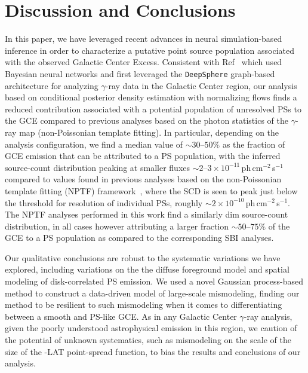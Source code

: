 \documentclass[prd,aps,10pt,nofootinbib,twocolumn,superscriptaddress,preprintnumbers,balancelastpage,longbibliography]{revtex4-1}
\begin{document}

\section{Discussion and Conclusions}
\label{sec:conclusion}

In this paper, we have leveraged recent advances in neural simulation-based inference in order to characterize a putative point source population associated with the observed \Fermi Galactic Center Excess. Consistent with Ref~\cite{List:2020mzd} which used Bayesian neural networks and first leveraged the \texttt{DeepSphere} graph-based architecture for analyzing $\gamma$-ray data in the Galactic Center region, our analysis based on conditional posterior density estimation with normalizing flows finds a reduced contribution associated with a potential population of unresolved PSs to the GCE compared to previous analyses based on the photon statistics of the $\gamma$-ray map (non-Poissonian template fitting). In particular, depending on the analysis configuration, we find a median value of $\sim30$--$50\%$ as the fraction of GCE emission that can be attributed to a PS population, with the inferred source-count distribution peaking at smaller fluxes $\sim2$--$3\times 10^{-11}$\,ph\,cm$^{-2}$\,s$^{-1}$ compared to values found in previous analyses based on the non-Poissonian template fitting (NPTF) framework~\cite{Lee:2015fea}, where the SCD is seen to peak just below the threshold for resolution of individual PSs, roughly $\sim2\times 10^{-10}$\,ph\,cm$^{-2}$\,s$^{-1}$. The NPTF analyses performed in this work find a similarly dim source-count distribution, in all cases however attributing a larger fraction $\sim50$--$75\%$ of the GCE to a PS population as compared to the corresponding SBI analyses.

Our qualitative conclusions are robust to the systematic variations we have explored, including variations on the the diffuse foreground model and spatial modeling of disk-correlated PS emission. We used a novel Gaussian process-based method to construct a data-driven model of large-scale mismodeling, finding our method to be resilient to such mismodeling when it comes to differentiating between a smooth and PS-like GCE. As in any Galactic Center $\gamma$-ray analysis, given the poorly understood astrophysical emission in this region, we caution of the potential of unknown systematics, such as mismodeling on the scale of the size of the \Fermi-LAT point-spread function, to bias the results and conclusions of our analysis.
\end{document}
